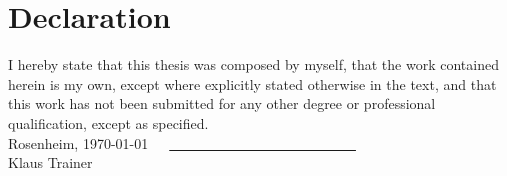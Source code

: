 \section*{Declaration}
I hereby state that this thesis was composed by myself, that the work contained herein is my own, except where explicitly stated otherwise in the text, and that this work has not been submitted for any other degree or professional qualification, except as specified.
\vspace{3em}\\
Rosenheim, \today \ \ \ \underline{ \ \ \ \ \ \ \ \ \ \ \ \ \ \ \ \ \ \ \ \ \ \ \ \ \ \ }\\
\hspace*{13.6em}\small{Klaus Trainer}
